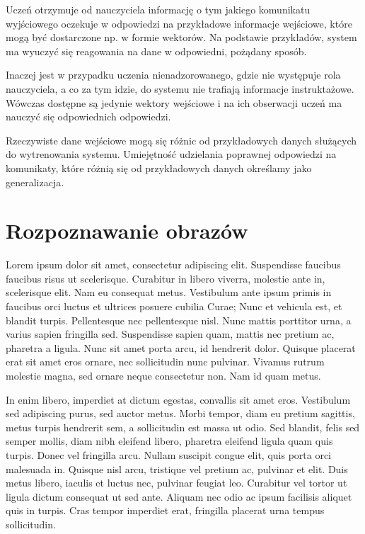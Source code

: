 Uczeń otrzymuje od nauczyciela informację o tym jakiego komunikatu wyjściowego oczekuje w odpowiedzi na przykładowe informacje wejściowe, które mogą być dostarczone np. w formie wektorów. Na podstawie przykładów, system ma wyuczyć się reagowania na dane w odpowiedni, pożądany sposób.


Inaczej jest w przypadku uczenia nienadzorowanego, gdzie nie występuje rola nauczyciela, a co za tym idzie, do systemu nie trafiają informacje instruktażowe. Wówczas dostępne są jedynie wektory wejściowe i na ich obserwacji uczeń ma nauczyć się odpowiednich odpowiedzi\cite{CICHOSZ00}.

Rzeczywiste dane wejściowe mogą się różnic od przykładowych danych służących do wytrenowania systemu. Umiejętność udzielania poprawnej odpowiedzi na komunikaty, które różnią się od przykładowych danych określamy jako generalizacja\cite{BISHOP06}.

\section{Rozpoznawanie obrazów}
Lorem ipsum dolor sit amet, consectetur adipiscing elit. Suspendisse faucibus faucibus risus ut scelerisque. Curabitur in libero viverra, molestie ante in, scelerisque elit. Nam eu consequat metus. Vestibulum ante ipsum primis in faucibus orci luctus et ultrices posuere cubilia Curae; Nunc et vehicula est, et blandit turpis. Pellentesque nec pellentesque nisl. Nunc mattis porttitor urna, a varius sapien fringilla sed. Suspendisse sapien quam, mattis nec pretium ac, pharetra a ligula. Nunc sit amet porta arcu, id hendrerit dolor. Quisque placerat erat sit amet eros ornare, nec sollicitudin nunc pulvinar. Vivamus rutrum molestie magna, sed ornare neque consectetur non. Nam id quam metus.

In enim libero, imperdiet at dictum egestas, convallis sit amet eros. Vestibulum sed adipiscing purus, sed auctor metus. Morbi tempor, diam eu pretium sagittis, metus turpis hendrerit sem, a sollicitudin est massa ut odio. Sed blandit, felis sed semper mollis, diam nibh eleifend libero, pharetra eleifend ligula quam quis turpis. Donec vel fringilla arcu. Nullam suscipit congue elit, quis porta orci malesuada in. Quisque nisl arcu, tristique vel pretium ac, pulvinar et elit. Duis metus libero, iaculis et luctus nec, pulvinar feugiat leo. Curabitur vel tortor ut ligula dictum consequat ut sed ante. Aliquam nec odio ac ipsum facilisis aliquet quis in turpis. Cras tempor imperdiet erat, fringilla placerat urna tempus sollicitudin.

